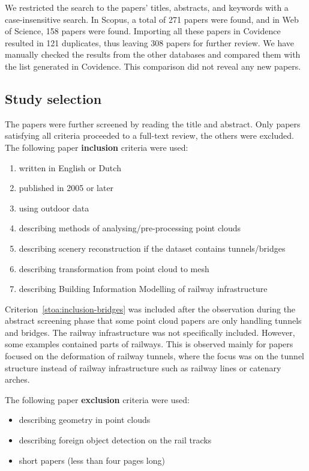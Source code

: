 We restricted the search to the papers' titles, abstracts, and keywords with a case-insensitive search. In Scopus, a total of 271 papers were found, and in Web of Science, 158 papers were found. Importing all these papers in Covidence resulted in 121 duplicates, thus leaving 308 papers for further review. We have manually checked the results from the other databases and compared them with the list generated in Covidence. This comparison did not reveal any new papers. 

\subsection{Study selection} 
The papers were further screened by reading the title and abstract. Only papers satisfying all criteria proceeded to a full-text review, the others were excluded. The following paper \textbf{inclusion} criteria were used:

\begin{enumerate}
    \item written in English or Dutch
    \item published in 2005 or later
    \item using outdoor data
    \item describing methods of analysing\slash pre-processing point clouds
    \item \label{stoa:inclusion-bridges} describing scenery reconstruction if the dataset contains tunnels/bridges
    \item describing transformation from point cloud to mesh
    \item describing Building Information Modelling of railway infrastructure
\end{enumerate}

Criterion~\ref{stoa:inclusion-bridges} was included after the observation during the abstract screening phase that some point cloud papers are only handling tunnels and bridges. The railway infrastructure was not specifically included. However, some examples contained parts of railways. This is observed mainly for papers focused on the deformation of railway tunnels, where the focus was on the tunnel structure instead of railway infrastructure such as railway lines or catenary arches.

The following paper \textbf{exclusion} criteria were used:

\begin{itemize}
    \item describing geometry in point clouds
    \item describing foreign object detection on the rail tracks
    \item short papers (less than four pages long)
\end{itemize}
	
